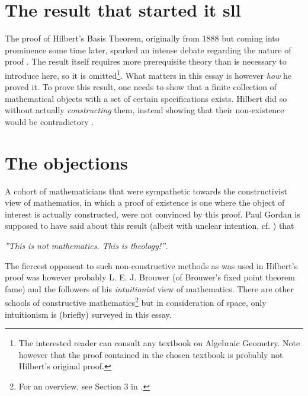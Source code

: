 \section{The result that started it sll}
The proof of Hilbert's Basis Theorem, originally from 1888 but coming into prominence some time later, sparked an intense debate regarding the nature of proof \cite[p.~1]{mclartyTheologyItsDiscontents2008}. The result itself requires more prerequisite theory than is necessary to introduce here, so it is omitted\footnote{The interested reader can consult any textbook on Algebraic Geometry. Note however that the proof contained in the chosen textbook is probably not Hilbert's original proof.}. What matters in this essay is however \emph{how} he proved it. To prove this result, one needs to show that a finite collection of mathematical objects with a set of certain specifications exists. Hilbert did so without actually \emph{constructing} them, instead showing that their non-existence would be contradictory \cite[p.~33]{reidHilbert1996}.

\section{The objections}
A cohort of mathematicians that were sympathetic towards the constructivist view of mathematics, in which a proof of existence is one where the object of interest is actually constructed, were not convinced by this proof. Paul Gordan is supposed to have said about this result (albeit with unclear intention, cf. \cite{mclartyTheologyItsDiscontents2008}) that

\begin{center}
\emph{''This is not mathematics. This is theology!''}\cite[p.~1]{mclartyTheologyItsDiscontents2008}.
\end{center}
The fiercest opponent to such non-constructive methods as was used in Hilbert's proof was however probably L. E. J. Brouwer (of Brouwer's fixed point theorem fame) and the followers of his \emph{intuitionist} view of mathematics. There are other schools of constructive mathematics\footnote{For an overview, see Section 3 in \cite{bridgesConstructiveMathematics2018}.} but in consideration of space, only intuitionism is (briefly) surveyed in this essay.

